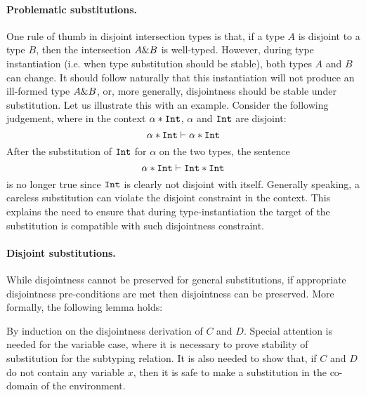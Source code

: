 \paragraph{Problematic substitutions.}
One rule of thumb in disjoint intersection types is that, if a type
$A$ is disjoint to a type $B$, then the intersection $A \& B$ is
well-typed.  However, during type instantiation (i.e. when type
substitution should be stable), both types $A$ and $B$ can change.  It
should follow naturally that this instantiation will not produce an
ill-formed type $A \& B$, or, more generally, disjointness should
be stable under substitution.  
Let us illustrate this with an example.
Consider the following judgement, where in the context $\alpha
* \texttt{Int}$, $\alpha$ and $\texttt{Int}$ are disjoint:
\[ \alpha * \texttt{Int} \vdash \alpha * \texttt{Int} \]
After the substitution of $\texttt{Int}$ for $\alpha$ on the two types, the sentence
\[ \alpha * \texttt{Int} \vdash \texttt{Int} * \texttt{Int} \]
is no longer true since $\texttt{Int}$ is clearly not disjoint with itself.
Generally speaking, a careless substitution can violate the disjoint constraint in the context.
This explains the need to ensure that during type-instantiation the target of the substitution  
is compatible with such disjointness constraint. 

\paragraph{Disjoint substitutions.}
While disjointness cannot be preserved for general substitutions,
if appropriate disjointness pre-conditions are met then disjointness can
be preserved. More formally, the following lemma holds: 

{By induction on the disjointness derivation of $C$ and $D$.
  Special attention is needed for the variable case, where it is necessary to prove stability
  of substitution for the subtyping relation.
  It is also needed to show that, if $C$ and $D$ do not contain any variable $x$, then it is
  safe to make a substitution in the co-domain of the environment.}

